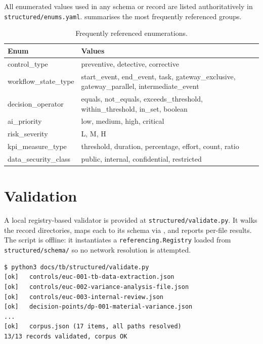 \documentclass[11pt,a4paper,twoside]{report}
\newcommand{\corpus}{}
\begin{document}
All enumerated values used in any schema or record are listed
authoritatively in \corpus\texttt{structured/enums.yaml}.
 summarises the most frequently referenced groups.

\begin{table}[htbp]
\caption{Frequently referenced enumerations.}\label{tab:enums}
\centering
\small
\begin{tabularx}{\linewidth}{@{}lX@{}}
\toprule
\textbf{Enum} & \textbf{Values} \\ \midrule
control\_type        & preventive, detective, corrective \\
workflow\_state\_type & start\_event, end\_event, task, gateway\_exclusive, gateway\_parallel, intermediate\_event \\
decision\_operator   & equals, not\_equals, exceeds\_threshold, within\_threshold, in\_set, boolean \\
ai\_priority         & low, medium, high, critical \\
risk\_severity       & L, M, H \\
kpi\_measure\_type    & threshold, duration, percentage, effort, count, ratio \\
data\_security\_class & public, internal, confidential, restricted \\
\bottomrule
\end{tabularx}
\end{table}

\section{Validation}

A local registry-based validator is provided at
\corpus\texttt{structured/validate.py}. It walks the record
directories, maps each to its schema via
, and reports per-file results. The script is
offline: it instantiates a \texttt{referencing.Registry} loaded from
\corpus\texttt{structured/schema/} so no network resolution is
attempted.

\begin{lstlisting}[caption={Running the validator.},label=lst:validate]
$ python3 docs/tb/structured/validate.py
[ok]   controls/euc-001-tb-data-extraction.json
[ok]   controls/euc-002-variance-analysis-file.json
[ok]   controls/euc-003-internal-review.json
[ok]   decision-points/dp-001-material-variance.json
...
[ok]   corpus.json (17 items, all paths resolved)
13/13 records validated, corpus OK
\end{lstlisting}
\end{document}
